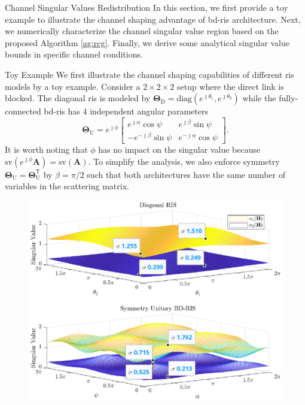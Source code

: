 \documentclass[journal]{IEEEtran}
\begin{document}
\begin{section}{Channel Singular Values Redistribution}
	\label{sc:singular_value}
	In this section, we first provide a toy example to illustrate the channel shaping advantage of \gls{bd}-\gls{ris} architecture.
	Next, we numerically characterize the channel singular value region based on the proposed Algorithm \ref{ag:rcg}.
	Finally, we derive some analytical singular value bounds in specific channel conditions.
	\begin{subsection}{Toy Example}\label{sc:toy_example}
		We first illustrate the channel shaping capabilities of different \gls{ris} models by a toy example.
		Consider a $2 \times 2 \times 2$ setup where the direct link is blocked.
		The diagonal \gls{ris} is modeled by $\mathbf{\Theta}_\mathrm{D} = \mathrm{diag}(e^{\jmath \theta_1}, e^{\jmath \theta_2})$ while the fully-connected \gls{bd}-\gls{ris} has 4 independent angular parameters
		\begin{equation}
			\mathbf{\Theta}_\mathrm{U} = e^{\jmath \phi} \begin{bmatrix}
				e^{\jmath \alpha} \cos \psi  & e^{\jmath \beta} \sin \psi   \\
				-e^{-\jmath \beta} \sin \psi & e^{-\jmath \alpha} \cos \psi
			\end{bmatrix}.
			\label{eq:unitary_ris}
		\end{equation}
		It is worth noting that $\phi$ has no impact on the singular value because $\mathrm{sv}(e^{\jmath \phi} \mathbf{A}) = \mathrm{sv}(\mathbf{A})$.
		To simplify the analysis, we also enforce symmetry $\mathbf{\Theta}_\mathrm{U} = \mathbf{\Theta}_\mathrm{U}^\mathsf{T}$ by $\beta = \pi / 2$ such that both architectures have the same number of variables in the scattering matrix.
		\begin{figure}
			\centering
			\includegraphics[width=\columnwidth]{assets/simulation/singular_trend.eps}

\end{figure}
\end{subsection}
\end{section}
\end{document}
